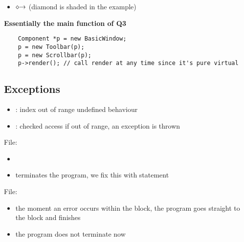 \begin{itemize}
      \item {} $ \diamond\text{\textrightarrow{}} $  (diamond
            is shaded in the  example)
\end{itemize}

\textbf{Essentially the main function of Q3}
\begin{lstlisting}
    Component *p = new BasicWindow;
    p = new Toolbar(p);
    p = new Scrollbar(p);
    p->render(); // call render at any time since it's pure virtual
\end{lstlisting}

\subsection{Exceptions}
\begin{itemize}
      \item {}: index out of range \textrightarrow{} undefined behaviour
      \item {}: checked access \textrightarrow{} if  out
            of range, an  exception is thrown
\end{itemize}

File: 
\begin{itemize}
      \item {}
      \item terminates the program, we fix this with  statement
\end{itemize}

File: 
\begin{itemize}
      \item the moment an error occurs within the  block, the program
            goes straight to the  block and finishes
      \item the program does not terminate now
\end{itemize}
